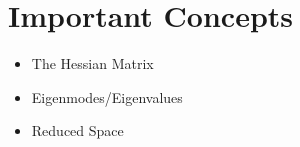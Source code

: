\section{Important Concepts}
\begin{itemize}
\item The Hessian Matrix
\item Eigenmodes/Eigenvalues
\item Reduced Space
\end{itemize}

